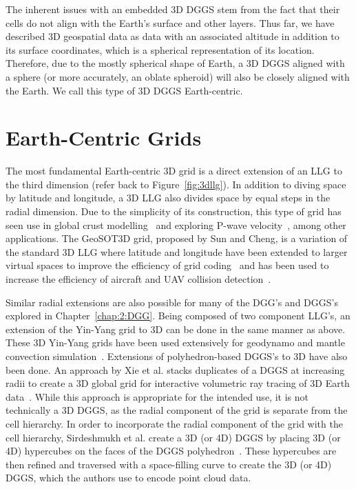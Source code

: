 The inherent issues with an embedded 3D DGGS stem from the fact that their cells do not align with the Earth's surface and other layers.
Thus far, we have described 3D geospatial data as data with an associated altitude in addition to its surface coordinates, which is a spherical representation of its location.
Therefore, due to the mostly spherical shape of Earth, a 3D DGGS aligned with a sphere (or more accurately, an oblate spheroid) will also be closely aligned with the Earth.
We call this type of 3D DGGS Earth-centric.


\section{Earth-Centric Grids} \label{chap:3:earthCentric}
The most fundamental Earth-centric 3D grid is a direct extension of an LLG to the third dimension (refer back to Figure~\ref{fig:3dllg}).
In addition to diving space by latitude and longitude, a 3D LLG also divides space by equal steps in the radial dimension.
Due to the simplicity of its construction, this type of grid has seen use in global crust modelling~\cite{bassin2000current} and exploring P-wave velocity~\cite{zhao2004global}, among other applications.
The GeoSOT3D grid, proposed by Sun and Cheng, is a variation of the standard 3D LLG where latitude and longitude have been extended to larger virtual spaces to improve the efficiency of grid coding~\cite{sun20153d} and has been used to increase the efficiency of aircraft and UAV collision detection~\cite{miao2019low, zhai2019collision}.


Similar radial extensions are also possible for many of the DGG's and DGGS's explored in Chapter~\ref{chap:2:DGG}.
Being composed of two component LLG's, an extension of the Yin-Yang grid to 3D can be done in the same manner as above.
These 3D Yin-Yang grids have been used extensively for geodynamo and mantle convection simulation~\cite{yoshida2004application, kageyama2005geodynamo, tackley2008modelling}.
Extensions of polyhedron-based DGGS's to 3D have also been done.
An approach by Xie et al. stacks duplicates of a DGGS at increasing radii to create a 3D global grid for interactive volumetric ray tracing of 3D Earth data~\cite{xie2013interactive}.
While this approach is appropriate for the intended use, it is not technically a 3D DGGS, as the radial component of the grid is separate from the cell hierarchy.
In order to incorporate the radial component of the grid with the cell hierarchy, Sirdeshmukh et al. create a 3D (or 4D) DGGS by placing 3D (or 4D) hypercubes on the faces of the DGGS polyhedron~\cite{sirdeshmukh2019utilizing}.
These hypercubes are then refined and traversed with a space-filling curve to create the 3D (or 4D) DGGS, which the authors use to encode point cloud data.


